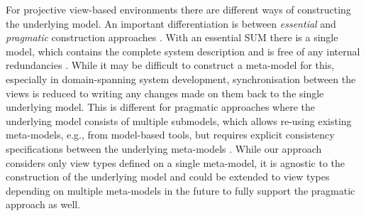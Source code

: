 For projective view-based environments there are different ways of constructing the underlying model.
An important differentiation is between \emph{essential} and \emph{pragmatic} construction approaches \autocite{atkinson_fundamental_2015}.
With an essential SUM there is a single model, which contains the complete system description and is free of any internal redundancies \autocite{atkinson_orthographic_2010}.
While it may be difficult to construct a meta-model for this, especially in domain-spanning system development, synchronisation between the views is reduced to writing any changes made on them back to the single underlying model.
This is different for pragmatic approaches where the underlying model consists of multiple submodels, which allows re-using existing meta-models, e.g., from model-based tools, but requires explicit consistency specifications between the underlying meta-models \autocite{klare_enabling_2021}.
While our approach considers only view types defined on a single meta-model, it is agnostic to the construction of the underlying model and could be extended to view types depending on multiple meta-models in the future to fully support the pragmatic approach as well.

\begin{comment}
\Textcite{atkinson_fundamental_2015} differentiate between \emph{essential} and \emph{pragmatic} SUMs.
With an essential SUM there is a single model, which contains the complete system description and is free of any internal redundancies.
For the synchronization between the views, this is the easiest solution, because the views are simply required to write any changes made on them back to the SUM.
Subsequently generated views are then automatically consistent.
An example of an approach employing an essential SUM is OSM by \textcite{atkinson_orthographic_2010}.
In contrast to a single redundancy-free model, there are also pragmatic approaches where the underlying model consists of multiple submodels.
The main benefit of pragmatic approaches is the construction of the underlying model.
While it is difficult to create a single redundancy-free \metamodel, especially for a domain-spanning system, pragmatic SUMs allow the integration of already available \metamodels, e.g., from development tools used in the various domains.
Additional effort is, however, necessary to keep the models consistent.
One framework for constructing pragmatic SUMs, here called virtual SUMs (V-SUMs), is Vitruvius \autocite{klare_enabling_2021}.
\end{comment}

